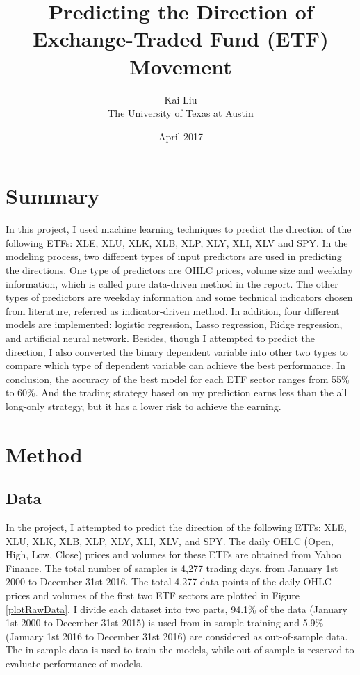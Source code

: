 \documentclass[letterpaper]{article}
\title{Predicting the Direction of Exchange-Traded Fund (ETF) Movement}
\author{Kai Liu \\ The University of Texas at Austin}
\date{April 2017}
\begin{document}
\maketitle

\section{Summary}
In this project, I used machine learning techniques to predict the direction of
the following ETFs: XLE, XLU, XLK, XLB, XLP, XLY, XLI, XLV and SPY. In the
modeling process, two different types of input predictors are used in
predicting the directions. One type of predictors are OHLC prices, volume size
and weekday information, which is called pure data-driven method in the report.
The other types of predictors are weekday information and some technical
indicators chosen from literature, referred as indicator-driven method. In
addition, four different models are implemented: logistic regression, Lasso
regression, Ridge regression, and artificial neural network. Besides, though I
attempted to predict the direction, I also converted the binary dependent
variable into other two types to compare which type of dependent variable can
achieve the best performance. In conclusion, the accuracy of the best model
for each ETF sector ranges from 55\% to 60\%. And the trading strategy based on
my prediction earns less than the all long-only strategy, but it has a lower
risk to achieve the earning.

\section{Method}
\subsection{Data}
In the project, I attempted to predict the direction of the following ETFs:
XLE, XLU, XLK, XLB, XLP, XLY, XLI, XLV, and SPY. The daily OHLC (Open, High,
Low, Close) prices and volumes for these ETFs are obtained from Yahoo Finance.
The total number of samples is 4,277 trading days, from January 1st 2000 to
December 31st 2016. The total 4,277 data points of the daily OHLC prices and
volumes of the first two ETF sectors are plotted in Figure \ref{plotRawData}. I
divide each dataset into two parts, 94.1\% of the data (January 1st 2000 to
December 31st 2015) is used from in-sample training and 5.9\% (January 1st 2016
to December 31st 2016) are considered as out-of-sample data. The in-sample data
is used to train the models, while out-of-sample is reserved to evaluate
performance of models.
\end{document}

